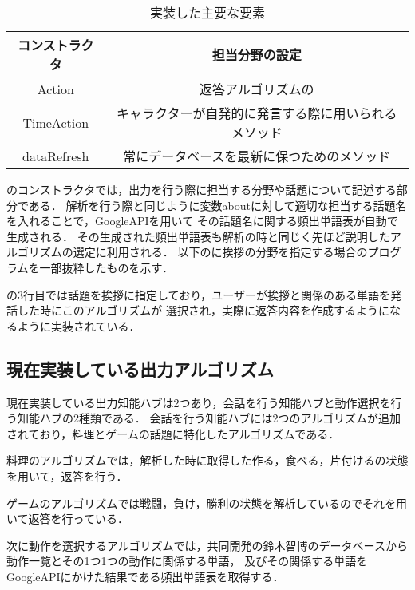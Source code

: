 \begin{table}[tbh]
	\caption{実装した主要な要素} \label{tab:parts}
	\begin{center}
		\begin{tabular}[htb]{c|c}
		\hline
		コンストラクタ & 担当分野の設定 \\
		\hline
		Action & 返答アルゴリズムの \\
		\hline
		TimeAction & キャラクターが自発的に発言する際に用いられるメソッド \\
		\hline
		dataRefresh & 常にデータベースを最新に保つためのメソッド \\
		\hline
		\end{tabular}
	\end{center}
\end{table}

のコンストラクタでは，出力を行う際に担当する分野や話題について記述する部分である．
解析を行う際と同じように変数aboutに対して適切な担当する話題名を入れることで，GoogleAPIを用いて
その話題名に関する頻出単語表が自動で生成される．
その生成された頻出単語表も解析の時と同じく先ほど説明したアルゴリズムの選定に利用される．
以下のに挨拶の分野を指定する場合のプログラムを一部抜粋したものを示す．


の3行目では話題を挨拶に指定しており，ユーザーが挨拶と関係のある単語を発話した時にこのアルゴリズムが
選択され，実際に返答内容を作成するようになるように実装されている．

\subsection{現在実装している出力アルゴリズム}\label{sec:back}
現在実装している出力知能ハブは2つあり，会話を行う知能ハブと動作選択を行う知能ハブの2種類である．
会話を行う知能ハブには2つのアルゴリズムが追加されており，料理とゲームの話題に特化したアルゴリズムである．

料理のアルゴリズムでは，解析した時に取得した作る，食べる，片付けるの状態を用いて，返答を行う．

ゲームのアルゴリズムでは戦闘，負け，勝利の状態を解析しているのでそれを用いて返答を行っている．

次に動作を選択するアルゴリズムでは，共同開発の鈴木智博のデータベースから動作一覧とその1つ1つの動作に関係する単語，
及びその関係する単語をGoogleAPIにかけた結果である頻出単語表を取得する\cite{suzuki}．


